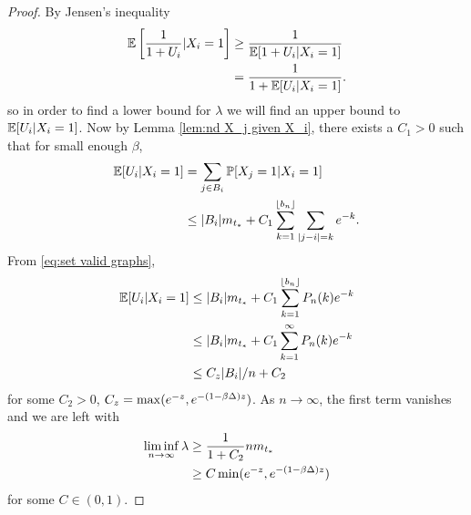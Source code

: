 \begin{proof}
		By Jensen's inequality
		\begin{align}
			\mathbb{E} \left[\frac{1}{1 + U_i}| X_i = 1\right] &\geq \frac{1}{\mathbb{E}[1 + U_i | X_i = 1]}\\
				&= \frac{1}{1 + \mathbb{E}[U_i | X_i = 1]}.
		\end{align}
		so in order to find a lower bound for $\lambda$ we will find an upper bound to $\mathbb{E}[U_i | X_i = 1]$. Now by Lemma \ref{lem:nd X_j given X_i}, there exists a $C_1>0$ such that for small enough $\beta$,
		\begin{align}
			\mathbb{E}[U_i | X_i = 1] &= \sum_{j \in B_i} \mathbb{P}[X_j = 1| X_i = 1]\\
				& \leq |B_i| m_{t_*} + C_1\sum_{k=1}^{\lfloor b_n \rfloor} \sum_{|j - i| = k} e^{-k}.
		\end{align}
		From \eqref{eq:set valid graphs},
		\begin{align}
			\mathbb{E}[U_i | X_i = 1] &\leq |B_i|m_{t_*} + C_1 \sum_{k=1}^{\lfloor b_n \rfloor} P_n(k) e^{-k}\\
			&\leq |B_i|m_{t_*} + C_1 \sum_{k=1}^{\infty} P_n(k) e^{-k}\\
			&\leq C_z|B_i|/n + C_2
		\end{align}
		for some $C_2 > 0$, $C_z = \max(e^{-z}, e^{-(1 - \beta \Delta)z})$.
		As $n \rightarrow \infty$, the first term vanishes and we are left with \begin{align}
			\liminf_{n \rightarrow \infty} \lambda &\geq \frac{1}{1 + C_2} n m_{t_*}\\
				&\geq C \min(e^{-z}, e^{-(1 - \beta\Delta)z}) 
		\end{align}
		for some $C \in (0, 1)$.
	\end{proof}

		

